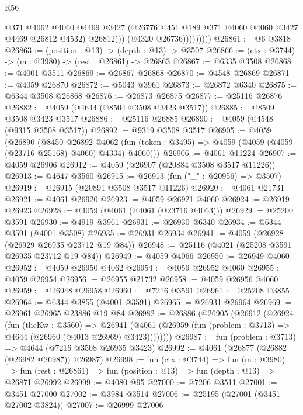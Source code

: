 \begin{lexlean}{R56}
\begin{coremodule}
                          @371
                          @4062
                          @4060
                          @4469
                          @3427
                          (@26776 @451 @189 @371 @4060 @4060 @3427 @4469 @26812 @4532)
                          @26812)))
                    (@4320 @26736)))))))))
@26861 := @6 @3818
@26863 := (position : @13) -> (depth : @13) -> @3507
@26866 := (ctx : @3744) -> (m : @3980) -> (rest : @26861) -> @26863
@26867 := @6335 @3508
@26868 := @4001 @3511
@26869 := @26867 @26868
@26870 := @4548 @26869
@26871 := @4059 @26870
@26872 := @5043 @3961
@26873 := @26872 @6340
@26875 := @6344 @3508 @26868
@26876 := @26873 @26875
@26877 := @25116 @26876
@26882 := @4059 (@4644 (@8504 @3508 @3423 @3517))
@26885 := @8509 @3508 @3423 @3517
@26886 := @25116 @26885
@26890 := @4059 (@4548 (@9315 @3508 @3517))
@26892 := @9319 @3508 @3517
@26905 := @4059
    (@26890
      (@8450
        @26892
        @4062
        (fun (token : @3495) => @4059 (@4059 (@4059 (@23716 @25168) @4060) @4334) @4060)))
@26906 := @4061 @11224
@26907 := @4059 @26906
@26912 := @4059 (@26907 (@20884 @3508 @3517 @11226))
@26913 := @4647 @3560
@26915 := @26913 (fun ("_" : @20956) => @3507)
@26919 := @26915 (@20891 @3508 @3517 @11226)
@26920 := @4061 @21731
@26921 := @4061 @26920
@26923 := @4059 @26921 @4060
@26924 := @26919 @26923
@26928 := @4059 (@4061 (@4061 (@23716 @4063)))
@26929 := @25200 @3591
@26930 := @4919 @3961
@26931 := @26930 @6340
@26934 := @6344 @3591 (@4001 @3508)
@26935 := @26931 @26934
@26941 := @4059 (@26928 (@26929 @26935 @23712 @19 @84))
@26948 := @25116 (@4021 (@25208 @3591 @26935 @23712 @19 @84))
@26949 := @4059 @4066
@26950 := @26949 @4060
@26952 := @4059 @26950 @4062
@26954 := @4059 @26952 @4060
@26955 := @4059 @26954
@26956 := @26955 @21732
@26958 := @4059 @26956 @4060
@26959 := @26948 @26958
@26960 := @7216 @3591
@26961 := @25208 @3855
@26964 := @6344 @3855 (@4001 @3591)
@26965 := @26931 @26964
@26969 := @26961 @26965 @23886 @19 @84
@26982 := @26886
    (@26905
      (@26912
        (@26924
          (fun (theKw : @3560) =>
          @26941 (@4061 (@26959 (fun (problem : @3713) => @4644 (@26960 (@4013 @26969) @3423))))))))
@26987 := fun (problem : @3713) => @4644 (@7216 @3508 @26935 @3423)
@26992 := @4061 (@26877 (@26882 (@26982 @26987)) @26987)
@26998 := fun (ctx : @3744) =>
  fun (m : @3980) =>
  fun (rest : @26861) => fun (position : @13) => fun (depth : @13) => @26871 @26992
@26999 := @4080 @95
@27000 := @7206 @3511
@27001 := @3451 @27000
@27002 := @3984 @3514
@27006 := @25195 (@27001 (@3451 @27002 @3824))
@27007 := @26999 @27006

\end{coremodule}
\end{lexlean}
